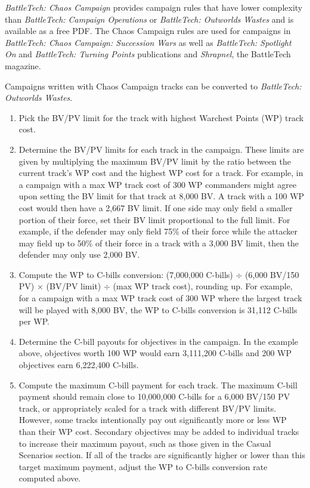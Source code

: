 \emph{BattleTech: Chaos Campaign} provides campaign rules that have lower complexity than \emph{BattleTech: Campaign Operations} or \emph{BattleTech: Outworlds Wastes} and is available as a free PDF.
The Chaos Campaign rules are used for campaigns in \emph{BattleTech: Chaos Campaign: Succession Wars} as well as \emph{BattleTech: Spotlight On} and \emph{BattleTech: Turning Points} publications and \emph{Shrapnel}, the BattleTech magazine.

Campaigns written with Chaos Campaign tracks can be converted to \emph{BattleTech: Outworlds Wastes}.

\begin{enumerate}

\item Pick the BV/PV limit for the track with highest Warchest Points (WP) track cost.

\item Determine the BV/PV limits for each track in the campaign.
These limits are given by multiplying the maximum BV/PV limit by the ratio between the current track's WP cost and the highest WP cost for a track.
For example, in a campaign with a max WP track cost of 300 WP commanders might agree upon setting the BV limit for that track at 8,000 BV.
A track with a 100 WP cost would then have a 2,667 BV limit.
If one side may only field a smaller portion of their force, set their BV limit proportional to the full limit.
For example, if the defender may only field 75\% of their force while the attacker may field up to 50\% of their force in a track with a 3,000 BV limit, then the defender may only use 2,000 BV.

\item Compute the WP to C-bills conversion: (7,000,000 C-bills) $\div$ (6,000 BV/150 PV) $\times$ (BV/PV limit) $\div$ (max WP track cost), rounding up.
For example, for a campaign with a max WP track cost of 300 WP where the largest track will be played with 8,000 BV, the WP to C-bills conversion is 31,112 C-bills per WP.

\item Determine the C-bill payouts for objectives in the campaign.
In the example above, objectives worth 100 WP would earn 3,111,200 C-bills and 200 WP objectives earn 6,222,400 C-bills.

\item Compute the maximum C-bill payment for each track.
The maximum C-bill payment should remain close to 10,000,000 C-bills for a 6,000 BV/150 PV track, or appropriately scaled for a track with different BV/PV limits.
However, some tracks intentionally pay out significantly more or less WP than their WP cost.
Secondary objectives may be added to individual tracks to increase their maximum payout, such as those given in the Casual Scenarios section.
If all of the tracks are significantly higher or lower than this target maximum payment, adjust the WP to C-bills conversion rate computed above.


\end{enumerate}
